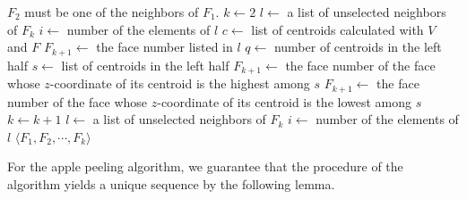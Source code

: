 \documentclass[]{interact}
\theoremstyle{plain}%
\theoremstyle{definition}
\theoremstyle{remark}
\begin{document}
\begin{algorithm}[tb]
\caption{Algorithm of apple peeling a polyhedron}
\label{peeling}
\begin{algorithmic}[1]
\Require $F_2$ must be one of the neighbors of $F_1$. 
    \State $k \gets 2$
    \State $l \gets $ a list of unselected neighbors of $F_{k}$
    \State $i\gets $ number of the elements of $l$
    \State $c\gets $ list of centroids calculated with $V$ and $F$ 
    \Repeat 
            \State $F_{k+1} \gets $ the face number listed in $l$
               \State $q \gets $ number of centroids in the left half
               \State $s \gets$ list of centroids in the left half
        		\State $F_{k+1} \gets $ the face number of the face whose $z$-coordinate of its centroid is the highest among $s$
	    \Else
		\State $F_{k+1} \gets $ the face number of the face whose $z$-coordinate of its centroid is the lowest among $s$
	    \EndIf
        \EndIf
        \State $k \gets k+1$
        \State $l \gets $ a list of unselected neighbors of $F_{k}$
	\State $i\gets $ number of the elements of $l$
    \State \Return $\langle{F_1, F_2, \cdots , F_{k}\rangle}$
\EndFunction
\end{algorithmic}
\end{algorithm}

For the apple peeling algorithm, we guarantee that the procedure of the algorithm yields a unique sequence by the following lemma.
\end{document}
